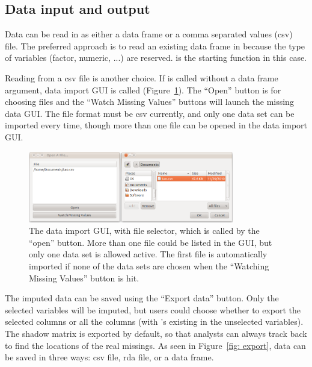 \documentclass[article]{jss}
\begin{document}
\subsection{Data input and output}

Data can be read in as either a data frame or a comma separated values (csv) file. The preferred approach is to read an existing data frame in  because the type of variables (factor, numeric, ...) are reserved.  is the starting function in this case.

Reading from a csv file is another choice.  If  is called without a data frame argument, data import GUI is called (Figure~\ref{fig: import}). The ``Open'' button is for choosing files and the ``Watch Missing Values'' buttons will launch the missing data GUI. The file format must be csv currently, and only one data set can be imported every time, though more than one file can be opened in the data import GUI.

\begin{center}
\begin{figure}[h]
\begin{centering}
\includegraphics[width=0.8\textwidth]{graph/fig6-open}
\par\end{centering}
\caption{The data import GUI, with file selector, which is called by the ``open'' button. More than one file could be listed in the GUI, but only one data set is allowed active. The first file is automatically imported if none of the data sets are chosen when the ``Watching Missing Values'' button is hit.}
\label{fig: import}
\end{figure}
\par\end{center}

The imputed data can be saved using the ``Export data'' button. Only the selected variables will be imputed, but users could choose whether to export the selected columns or all the columns (with 's existing in the unselected variables). The shadow matrix is exported by default, so that analysts can always track back to find the locations of the real missings. As seen in Figure~\ref{fig: export}, data can be saved in three ways: csv file, rda file, or a data frame.
\end{document}
